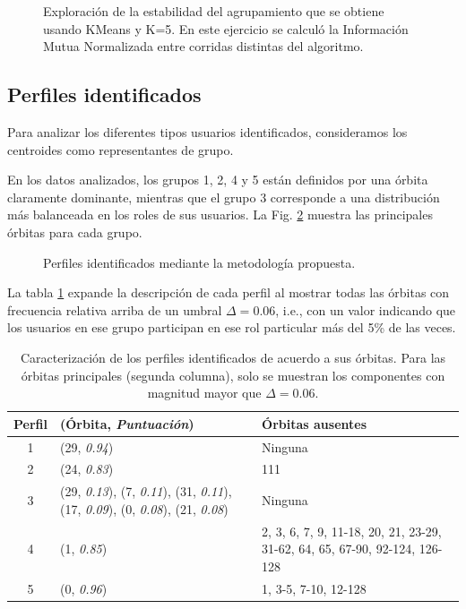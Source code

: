 \begin{figure}[htbp]
   \centering
   
    \caption{Exploración de la estabilidad del agrupamiento que se obtiene usando KMeans y K=5. En este ejercicio se calculó la Información Mutua Normalizada entre corridas distintas del algoritmo.}
    \label{fig:estability-NMI}
\end{figure}

\subsection{Perfiles identificados}
Para analizar los diferentes tipos usuarios identificados, consideramos los centroides como representantes de grupo. 

En los datos analizados, los grupos 1, 2, 4 y 5 están definidos por una órbita claramente dominante, mientras que el grupo 3 corresponde a una distribución más balanceada en los roles de sus usuarios. La Fig. \ref{fig:perfiles} muestra las principales órbitas para cada grupo. 

\begin{figure}[htbp]
   \centering
   
    \caption{Perfiles identificados mediante la metodología propuesta. }
    \label{fig:perfiles}
\end{figure}

La tabla \ref{table:orbitsgroups} expande la descripción de cada perfil al mostrar todas las órbitas con frecuencia relativa arriba de un umbral $\Delta = 0.06$, i.e., con un valor indicando que los usuarios en ese grupo participan en ese rol particular más del 5\% de las veces. 
\begin{table}[]    
    \centering
    \caption{Caracterización de los perfiles identificados de acuerdo a sus órbitas. Para las órbitas principales (segunda columna), solo se muestran los componentes con magnitud mayor que $\Delta=0.06$.}
    \begin{tabular}{cp{}p{}}\hline
         \textbf{Perfil}\phantom{xx} & \textbf{(Órbita, \textit{Puntuación})}&\textbf{Órbitas ausentes}\\\hline\hline
         1& (29, \textit{0.94}) & Ninguna \\ 
         2&(24, \textit{0.83}) & 111 \\\hline
         3&(29, \textit{0.13}), (7, \textit{0.11}), \newline(31, \textit{0.11}), (17, \textit{0.09}), \newline(0, \textit{0.08}), (21, \textit{0.08}) & Ninguna \\
         4& (1, \textit{0.85}) & 2, 3, 6, 7, 9, 11-18, 20, 21, 23-29, 31-62, 64, 65, 67-90, 92-124, 126-128\\
         5&(0, \textit{0.96})&1, 3-5, 7-10, 12-128\\
    \end{tabular}
    \label{table:orbitsgroups}
\end{table}

